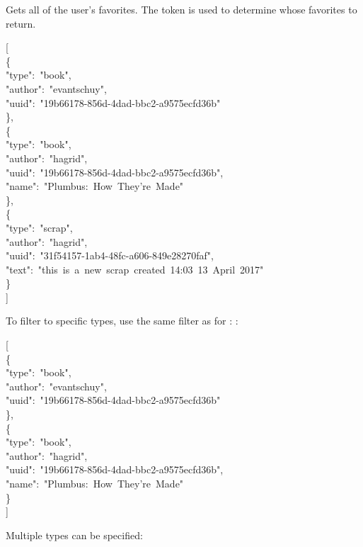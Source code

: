 \documentclass[onecolumn, draftclsnofoot, 10pt, compsoc]{IEEEtran}
\begin{document}
\noindent Gets all of the user's favorites. The token is used to determine whose favorites
to return.%
\begin{mdpre}%
\noindent{}[\\
\{\\
"type":~"book",\\
"author":~"evantschuy",\\
"uuid":~"19b66178-856d-4dad-bbc2-a9575ecfd36b"\\
\},\\
\{\\
"type":~"book",\\
"author":~"hagrid",\\
"uuid":~"19b66178-856d-4dad-bbc2-a9575ecfd36b",\\
"name":~"Plumbus:~How~They're~Made"\\
\},\\
\{\\
"type":~"scrap",\\
"author":~"hagrid",\\
"uuid":~"31f54157-1ab4-48fc-a606-849e28270faf",\\
"text":~"this~is~a~new~scrap~created~14:03~13~April~2017"\\
\}\\
]%
\end{mdpre}\noindent To filter to specific types, use the same filter as for : :

\begin{mdpre}%
\noindent{}[\\
\{\\
"type":~"book",\\
"author":~"evantschuy",\\
"uuid":~"19b66178-856d-4dad-bbc2-a9575ecfd36b"\\
\},\\
\{\\
"type":~"book",\\
"author":~"hagrid",\\
"uuid":~"19b66178-856d-4dad-bbc2-a9575ecfd36b",\\
"name":~"Plumbus:~How~They're~Made"\\
\}\\
]%
\end{mdpre}\noindent Multiple types can be specified:
\end{document}
